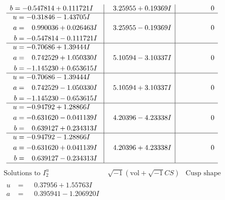 \documentclass[1p]{elsarticle_modified}
\theoremstyle{definition}
\newcommand{\I}{\sqrt{-1}}
\begin{document}
$$\begin{array}{c|c|c}
\begin{aligned}
b &= -0.547814 + 0.111721 I\end{aligned}
 & \phantom{-}3.25955 + 0.19369 I & \phantom{-0.000000 } 0 \\ \hline\begin{aligned}
u &= -0.31846 - 1.43705 I \\
a &= \phantom{-}0.990036 + 0.026463 I \\
b &= -0.547814 - 0.111721 I\end{aligned}
 & \phantom{-}3.25955 - 0.19369 I & \phantom{-0.000000 } 0 \\ \hline\begin{aligned}
u &= -0.70686 + 1.39444 I \\
a &= \phantom{-}0.742529 + 1.050330 I \\
b &= -1.145230 + 0.653615 I\end{aligned}
 & \phantom{-}5.10594 - 3.10337 I & \phantom{-0.000000 } 0 \\ \hline\begin{aligned}
u &= -0.70686 - 1.39444 I \\
a &= \phantom{-}0.742529 - 1.050330 I \\
b &= -1.145230 - 0.653615 I\end{aligned}
 & \phantom{-}5.10594 + 3.10337 I & \phantom{-0.000000 } 0 \\ \hline\begin{aligned}
u &= -0.94792 + 1.28866 I \\
a &= -0.631620 - 0.041139 I \\
b &= \phantom{-}0.639127 + 0.234313 I\end{aligned}
 & \phantom{-}4.20396 - 4.23338 I & \phantom{-0.000000 } 0 \\ \hline\begin{aligned}
u &= -0.94792 - 1.28866 I \\
a &= -0.631620 + 0.041139 I \\
b &= \phantom{-}0.639127 - 0.234313 I\end{aligned}
 & \phantom{-}4.20396 + 4.23338 I & \phantom{-0.000000 } 0\\
 \hline 
 \end{array}$$\newpage$$\begin{array}{c|c|c}  
\text{Solutions to }I^u_{2}& \I (\text{vol} + \sqrt{-1}CS) & \text{Cusp shape}\\
 \hline 
\begin{aligned}
u &= \phantom{-}0.37956 + 1.55763 I \\
a &= \phantom{-}0.395941 - 1.206920 I \\

\end{aligned}
\end{array}$$
\end{document}
